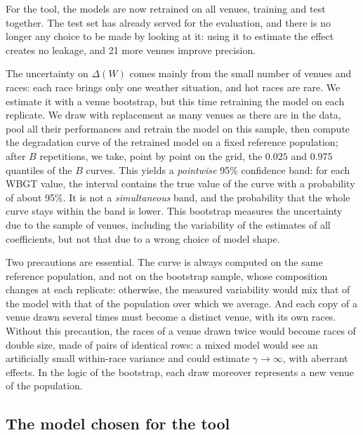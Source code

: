 \documentclass[11pt,a4paper]{article}
\begin{document}
For the tool, the models are now retrained on all venues, training and test together. The test set has already served
for the evaluation, and there is no longer any choice to be made by looking at it: using it to estimate the effect
creates no leakage, and 21 more venues improve precision.

The uncertainty on $\Delta(W)$ comes mainly from the small number of venues and races: each race brings only one
weather situation, and hot races are rare. We estimate it with a venue bootstrap, but this time retraining the model on
each replicate. We draw with replacement as many venues as there are in the data, pool all their performances and
retrain the model on this sample, then compute the degradation curve of the retrained model on a fixed reference
population; after $B$ repetitions, we take, point by point on the grid, the $0.025$ and $0.975$ quantiles of the $B$
curves. This yields a \emph{pointwise} 95\% confidence band: for each WBGT value, the interval contains the true value
of the curve with a probability of about 95\%. It is not a \emph{simultaneous} band, and the probability that the whole
curve stays within the band is lower. This bootstrap measures the uncertainty due to the sample of venues, including
the variability of the estimates of all coefficients, but not that due to a wrong choice of model shape.

Two precautions are essential. The curve is always computed on the same reference population, and not on the bootstrap
sample, whose composition changes at each replicate: otherwise, the measured variability would mix that of the model
with that of the population over which we average. And each copy of a venue drawn several times must become a distinct
venue, with its own races. Without this precaution, the races of a venue drawn twice would become races of double size,
made of pairs of identical rows: a mixed model would see an artificially small within-race variance and could estimate
$\gamma \to \infty$, with aberrant effects. In the logic of the bootstrap, each draw moreover represents a new venue of
the population.

\subsection{The model chosen for the tool}\label{sec:tool_model}
\end{document}
